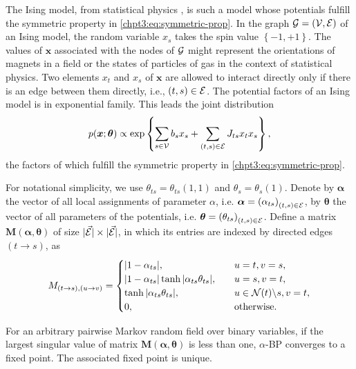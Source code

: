 \begin{example}
  The Ising model, from statistical physics \cite{ising1925, PhysRev.65.117}, is such a model whose potentials fulfill the symmetric property in \eqref{chpt3:eq:symmetric-prop}. In the graph $\mathcal{G} = (\mathcal{V}, \mathcal{E})$ of an Ising model, the random variable $x_s$ takes the spin value $\left\{ -1, +1 \right\}$. The values of $\bm{x}$ associated with the nodes of $\mathcal{G}$ might represent the orientations of magnets in a field or the states of particles of gas in the context of statistical physics. Two elements $x_t$ and $x_s$ of $\bm{x}$ are allowed to interact directly only if there is an edge between them directly, i.e., $(t, s) \in \mathcal{E}$. The potential factors of an Ising model is in exponential family. This leads the joint distribution
  \begin{equation*}
    p(\bm{x};\bm{\theta}) \propto \exp\left\{ \sum_{s\in \mathcal{V}} b_s x_s + \sum_{(t, s) \in \mathcal{E}} J_{ts} x_t x_s \right\},
  \end{equation*}
  the factors of which fulfill the symmetric property in \eqref{chpt3:eq:symmetric-prop}.
\end{example}

For notational simplicity, we use $\theta_{ts}=\theta_{ts}(1, 1)$ and $\theta_s = \theta_s(1)$. Denote by $\bm{\alpha}$ the vector of all local assignments of parameter $\alpha$, i.e. $\bm{\alpha} = \left(  \alpha_{ts} \right)_{(t ,s) \in \mathcal{E} }$, by $\bm{\theta}$ the vector of all parameters of the potentials, i.e. $\bm{\theta} = \left(  \theta_{ts} \right)_{(t ,s) \in \mathcal{E} }$.  Define a matrix $\bm{M}(\bm{\alpha}, \bm{\theta})$ of size $| \vec{\mathcal{E}} | \times | \vec{\mathcal{E}} |$, in which its entries are indexed by directed edges $(t\rightarrow s)$, as
\begin{align}\label{eq:matrix_m}
  M_{(t\rightarrow s), (u \rightarrow v)} =
  \begin{cases}
    |  1 - \alpha_{ts} |, &\quad u=t, v=s, \\
    |  1 - \alpha_{ts} | \tanh | \alpha_{ts} \theta_{ts} |, & \quad u = s, v =t, \\
    \tanh| \alpha_{ts} \theta_{ts} |, & \quad u \in \mathcal{N}(t)\backslash s, v = t, \\
    0, & \quad \mathrm{otherwise}.
  \end{cases}
\end{align}
\begin{theorem}\label{thm:normd}
  For an arbitrary pairwise Markov random field over binary variables,
  if the largest singular value of matrix $\bm{M}(\bm{\alpha}, \bm{\theta})$ is less than one,
  $\alpha$-BP converges to a fixed point. The associated fixed point is unique.
\end{theorem}

